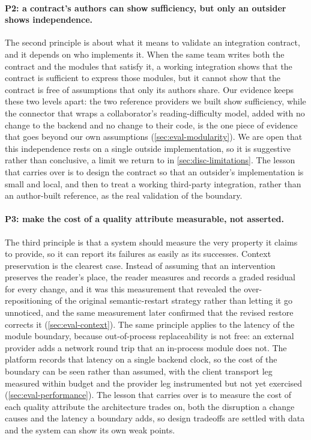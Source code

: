 \paragraph{P2: a contract's authors can show sufficiency, but only an outsider shows independence.}
The second principle is about what it means to validate an integration contract, and it depends on who implements it.
When the same team writes both the contract and the modules that satisfy it, a working integration shows that the contract is sufficient to express those modules, but it cannot show that the contract is free of assumptions that only its authors share.
Our evidence keeps these two levels apart: the two reference providers we built show sufficiency, while the connector that wraps a collaborator's reading-difficulty model, added with no change to the backend and no change to their code, is the one piece of evidence that goes beyond our own assumptions (\cref{sec:eval-modularity}).
We are open that this independence rests on a single outside implementation, so it is suggestive rather than conclusive, a limit we return to in \cref{sec:disc-limitations}.
The lesson that carries over is to design the contract so that an outsider's implementation is small and local, and then to treat a working third-party integration, rather than an author-built reference, as the real validation of the boundary.

\paragraph{P3: make the cost of a quality attribute measurable, not asserted.}
The third principle is that a system should measure the very property it claims to provide, so it can report its failures as easily as its successes.
Context preservation is the clearest case.
Instead of assuming that an intervention preserves the reader's place, the reader measures and records a graded residual for every change, and it was this measurement that revealed the over-repositioning of the original semantic-restart strategy rather than letting it go unnoticed, and the same measurement later confirmed that the revised restore corrects it (\cref{sec:eval-context}).
The same principle applies to the latency of the module boundary, because out-of-process replaceability is not free: an external provider adds a network round trip that an in-process module does not.
The platform records that latency on a single backend clock, so the cost of the boundary can be seen rather than assumed, with the client transport leg measured within budget and the provider leg instrumented but not yet exercised (\cref{sec:eval-performance}).
The lesson that carries over is to measure the cost of each quality attribute the architecture trades on, both the disruption a change causes and the latency a boundary adds, so design tradeoffs are settled with data and the system can show its own weak points.

